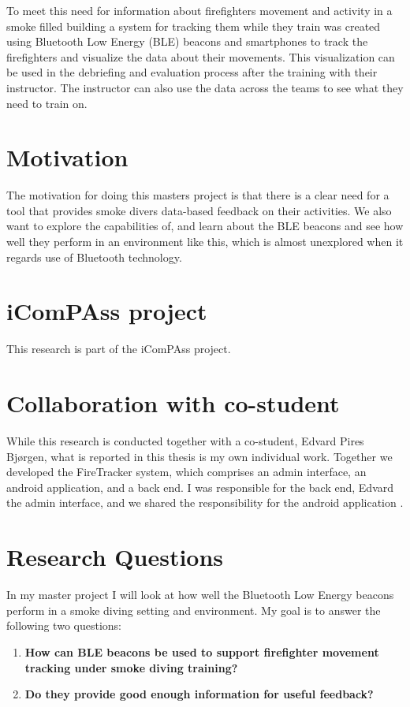 \documentclass[../Main/thesis.tex]{subfiles}
\begin{document}
To meet this need for information about firefighters movement and activity in a smoke filled building a system for tracking them while they train was created using Bluetooth Low Energy (BLE) beacons and smartphones to track the firefighters and visualize the data about their movements. 
This visualization can be used in the debriefing and evaluation process after the training with their instructor.
The instructor can also use the data across the teams to see what they need to train on.

\section{Motivation}
The motivation for doing this masters project is that there is a clear need for a tool that provides smoke divers data-based feedback on their activities.
We also want to explore the capabilities of, and learn about the BLE beacons and see how well they perform in an environment like this, which is almost unexplored when it regards use of Bluetooth technology. 

\section{iComPAss project}
This research is part of the iComPAss project. \citep{Netteland2016}

\section{Collaboration with co-student}
While this research is conducted together with a co-student, Edvard Pires Bjørgen, what is reported in this thesis is my own individual work.
Together we developed the FireTracker system, which comprises an admin interface, an android application, and a back end.
I was responsible for the back end, Edvard the admin interface, and we shared the responsibility for the android application \citep{Bjorgen2018}.

\section{Research Questions}
\label{ch:reserch_questions}
In my master project I will look at how well the Bluetooth Low Energy beacons perform in a smoke diving setting and environment. 
My goal is to answer the following two questions:

\begin{enumerate}
	\item \textbf{How can BLE beacons be used to support firefighter movement tracking under smoke diving training?}
	\item \textbf{Do they provide good enough information for useful feedback?}
\end{enumerate}
\end{document}
